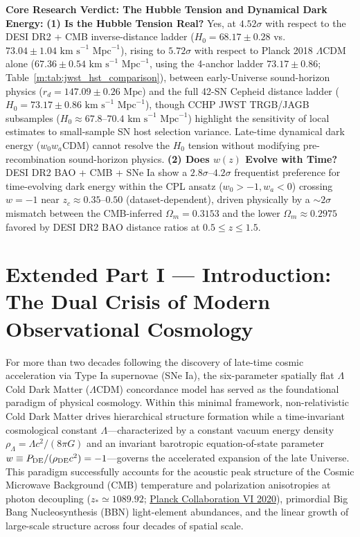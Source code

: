\documentclass[aps,prd,preprint,superscriptaddress,nofootinbib]{revtex4-2}
\newcommand{\takeaway}[2]{\vspace{6pt}\noindent\colorbox{boxbg}{\parbox{\dimexpr\textwidth-2\fboxsep\relax}{\vspace{5pt}\textbf{\color{primary}#1:}\hspace{0.4em}#2\vspace{5pt}}}\vspace{6pt}}
\begin{document}
\takeaway{Core Research Verdict: The Hubble Tension and Dynamical Dark Energy}{%
\textbf{(1) Is the Hubble Tension Real?} Yes, at $4.52\sigma$ with respect to the DESI DR2 + CMB inverse-distance ladder ($H_0 = 68.17 \pm 0.28$ vs.\ $73.04 \pm 1.04\text{ km s}^{-1}\text{ Mpc}^{-1}$), rising to $5.72\sigma$ with respect to Planck 2018 $\Lambda$CDM alone ($67.36 \pm 0.54\text{ km s}^{-1}\text{ Mpc}^{-1}$, using the 4-anchor ladder $73.17 \pm 0.86$; Table~\ref{m:tab:jwst_hst_comparison}), between early-Universe sound-horizon physics ($r_d = 147.09 \pm 0.26\text{ Mpc}$) and the full 42-SN Cepheid distance ladder ($H_0 = 73.17 \pm 0.86\text{ km s}^{-1}\text{ Mpc}^{-1}$), though CCHP JWST TRGB/JAGB subsamples ($H_0 \approx 67.8\text{--}70.4\text{ km s}^{-1}\text{ Mpc}^{-1}$) highlight the sensitivity of local estimates to small-sample SN host selection variance. Late-time dynamical dark energy ($w_0 w_a$CDM) cannot resolve the $H_0$ tension without modifying pre-recombination sound-horizon physics. \textbf{(2) Does $w(z)$ Evolve with Time?} DESI DR2 BAO + CMB + SNe Ia show a $2.8\sigma\text{--}4.2\sigma$ frequentist preference for time-evolving dark energy within the CPL ansatz ($w_0 > -1, w_a < 0$) crossing $w=-1$ near $z_c \approx 0.35\text{--}0.50$ (dataset-dependent), driven physically by a $\sim 2\sigma$ mismatch between the CMB-inferred $\Omega_m = 0.3153$ and the lower $\Omega_m \approx 0.2975$ favored by DESI DR2 BAO distance ratios at $0.5 \le z \le 1.5$.}

\section{Extended Part I --- Introduction: The Dual Crisis of Modern Observational Cosmology}

For more than two decades following the discovery of late-time cosmic acceleration via Type Ia supernovae (SNe Ia), the six-parameter spatially flat $\Lambda$ Cold Dark Matter ($\Lambda$CDM) concordance model has served as the foundational paradigm of physical cosmology. Within this minimal framework, non-relativistic Cold Dark Matter drives hierarchical structure formation while a time-invariant cosmological constant $\Lambda$---characterized by a constant vacuum energy density $\rho_\Lambda = \Lambda c^2 / (8\pi G)$ and an invariant barotropic equation-of-state parameter $w \equiv P_{\rm DE}/(\rho_{\rm DE}c^2) = -1$---governs the accelerated expansion of the late Universe. This paradigm successfully accounts for the acoustic peak structure of the Cosmic Microwave Background (CMB) temperature and polarization anisotropies at photon decoupling ($z_* \simeq 1089.92$; \href{https://arxiv.org/abs/1807.06209}{Planck Collaboration VI 2020}), primordial Big Bang Nucleosynthesis (BBN) light-element abundances, and the linear growth of large-scale structure across four decades of spatial scale.
\end{document}
